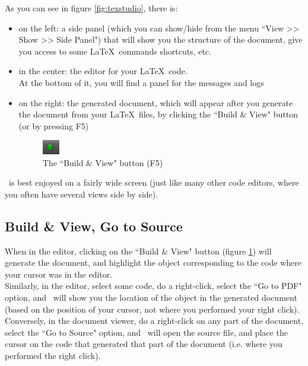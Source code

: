 As you can see in figure \ref{fig:texstudio}, there is:
\begin{itemize}
	\item on the left: a side panel (which you can show/hide from the menu ``View >> Show >> Side Panel") that will show you the structure of the document, give you access to some \LaTeX\ commands shortcuts, etc.
	\item in the center: the editor for your \LaTeX\ code. \\
	At the bottom of it, you will find a panel for the messages and logs
	\item on the right: the generated document, which will appear after you generate the document from your \LaTeX\ files, by clicking the ``Build \& View" button (or by pressing F5)
	\begin{figure}[h]
		\caption{The ``Build \& View" button (F5)} \label{fig:build-and-view}
		\centering
		\includegraphics[keepaspectratio,width=2em]{files/build-and-view.png}
	\end{figure} 
\end{itemize}

\TeXstudio\ is best enjoyed on a fairly wide screen (just like many other code editors, where you often have several views side by side). \\

\bigskip

\subsection{Build \& View, Go to Source} \label{build-and-view}

When in the editor, clicking on the ``Build \& View" button (figure \ref{fig:build-and-view}) will generate the document, and highlight the object corresponding to the code where your cursor was in the editor. \\

Similarly, in the editor, select some code, do a right-click, select the ``Go to PDF" option, and \TeXstudio\ will show you the location of the object in the generated document (based on the position of your cursor, not where you performed your right click). \\

Conversely, in the document viewer, do a right-click on any part of the document, select the ``Go to Source" option, and \TeXstudio\ will open the source file, and place the cursor on the code that generated that part of the document (i.e. where you performed the right click). \\

